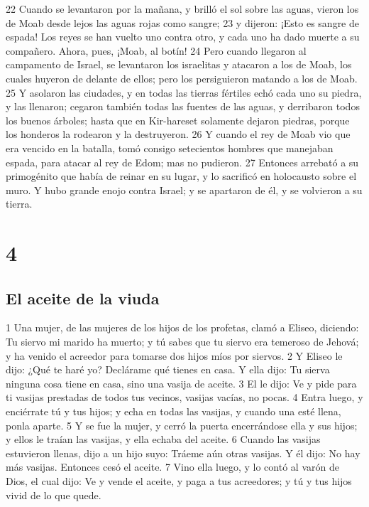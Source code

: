 22 Cuando se levantaron por la mañana, y brilló el sol sobre las aguas, vieron los de Moab desde lejos las aguas rojas como sangre;
23 y dijeron: ¡Esto es sangre de espada! Los reyes se han vuelto uno contra otro, y cada uno ha dado muerte a su compañero. Ahora, pues, ¡Moab, al botín!
24 Pero cuando llegaron al campamento de Israel, se levantaron los israelitas y atacaron a los de Moab, los cuales huyeron de delante de ellos; pero los persiguieron matando a los de Moab.
25 Y asolaron las ciudades, y en todas las tierras fértiles echó cada uno su piedra, y las llenaron; cegaron también todas las fuentes de las aguas, y derribaron todos los buenos árboles; hasta que en Kir-hareset solamente dejaron piedras, porque los honderos la rodearon y la destruyeron.
26 Y cuando el rey de Moab vio que era vencido en la batalla, tomó consigo setecientos hombres que manejaban espada, para atacar al rey de Edom; mas no pudieron.
27 Entonces arrebató a su primogénito que había de reinar en su lugar, y lo sacrificó en holocausto sobre el muro. Y hubo grande enojo contra Israel; y se apartaron de él, y se volvieron a su tierra.

\chapter{4}

\section*{El aceite de la viuda}


1 Una mujer, de las mujeres de los hijos de los profetas, clamó a Eliseo, diciendo: Tu siervo mi marido ha muerto; y tú sabes que tu siervo era temeroso de Jehová; y ha venido el acreedor para tomarse dos hijos míos por siervos.
2 Y Eliseo le dijo: ¿Qué te haré yo? Declárame qué tienes en casa. Y ella dijo: Tu sierva ninguna cosa tiene en casa, sino una vasija de aceite.
3 El le dijo: Ve y pide para ti vasijas prestadas de todos tus vecinos, vasijas vacías, no pocas.
4 Entra luego, y enciérrate tú y tus hijos; y echa en todas las vasijas, y cuando una esté llena, ponla aparte.
5 Y se fue la mujer, y cerró la puerta encerrándose ella y sus hijos; y ellos le traían las vasijas, y ella echaba del aceite.
6 Cuando las vasijas estuvieron llenas, dijo a un hijo suyo: Tráeme aún otras vasijas. Y él dijo: No hay más vasijas. Entonces cesó el aceite.
7 Vino ella luego, y lo contó al varón de Dios, el cual dijo: Ve y vende el aceite, y paga a tus acreedores; y tú y tus hijos vivid de lo que quede.
